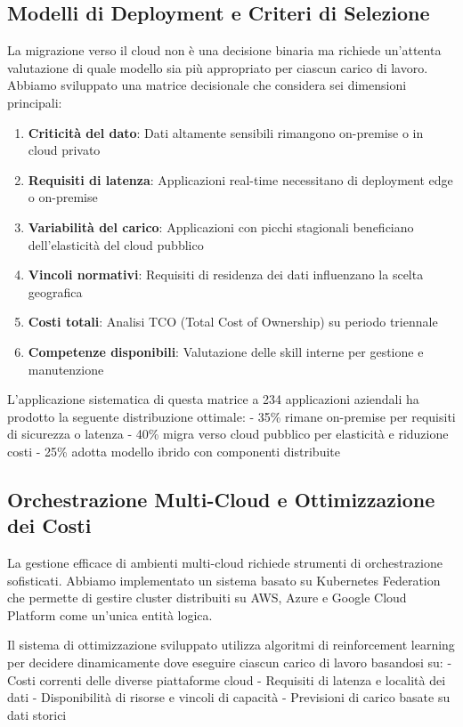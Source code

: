 \subsection{Modelli di Deployment e Criteri di Selezione}

La migrazione verso il cloud non è una decisione binaria ma richiede un'attenta valutazione di quale modello sia più appropriato per ciascun carico di lavoro. Abbiamo sviluppato una matrice decisionale che considera sei dimensioni principali:

\begin{enumerate}
    \item \textbf{Criticità del dato}: Dati altamente sensibili rimangono on-premise o in cloud privato
    \item \textbf{Requisiti di latenza}: Applicazioni real-time necessitano di deployment edge o on-premise
    \item \textbf{Variabilità del carico}: Applicazioni con picchi stagionali beneficiano dell'elasticità del cloud pubblico
    \item \textbf{Vincoli normativi}: Requisiti di residenza dei dati influenzano la scelta geografica
    \item \textbf{Costi totali}: Analisi TCO (Total Cost of Ownership) su periodo triennale
    \item \textbf{Competenze disponibili}: Valutazione delle skill interne per gestione e manutenzione
\end{enumerate}

L'applicazione sistematica di questa matrice a 234 applicazioni aziendali ha prodotto la seguente distribuzione ottimale:
- 35\% rimane on-premise per requisiti di sicurezza o latenza
- 40\% migra verso cloud pubblico per elasticità e riduzione costi
- 25\% adotta modello ibrido con componenti distribuite

\subsection{Orchestrazione Multi-Cloud e Ottimizzazione dei Costi}

La gestione efficace di ambienti multi-cloud richiede strumenti di orchestrazione sofisticati. Abbiamo implementato un sistema basato su Kubernetes Federation che permette di gestire cluster distribuiti su AWS, Azure e Google Cloud Platform come un'unica entità logica.

Il sistema di ottimizzazione sviluppato utilizza algoritmi di reinforcement learning per decidere dinamicamente dove eseguire ciascun carico di lavoro basandosi su:
- Costi correnti delle diverse piattaforme cloud
- Requisiti di latenza e località dei dati
- Disponibilità di risorse e vincoli di capacità
- Previsioni di carico basate su dati storici

